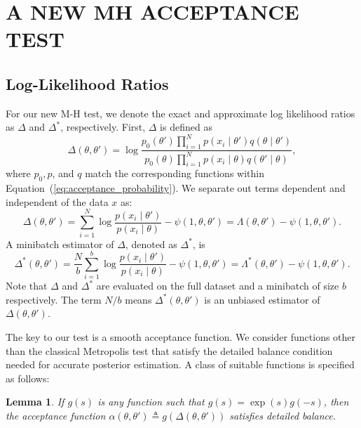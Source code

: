 \documentclass{article}
\newtheorem{lemma}{Lemma}
\begin{document}
\section{A NEW MH ACCEPTANCE TEST}\label{sec:our_algorithm}

\subsection{Log-Likelihood Ratios}\label{ssec:log_likelihood_ratios}

For our new M-H test, we denote the exact and approximate log likelihood ratios
as $\Delta$ and $\Delta^*$, respectively. First, $\Delta$ is defined as
\begin{equation}\label{eq:delta1}
    \Delta(\theta,\theta')  =
    \log \frac{p_0(\theta')\prod_{i=1}^N p(x_i \mid \theta')q(\theta \mid
    \theta')}{p_0(\theta)\prod_{i=1}^N p(x_i \mid \theta)q(\theta' \mid\theta)},
\end{equation}
where $p_0, p$, and $q$ match the corresponding functions within
Equation~(\ref{eq:acceptance_probability}). We separate out terms dependent and
independent of the data $x$ as:
\begin{equation}\label{eq:delta2}
\Delta(\theta,\theta') = \sum_{i=1}^N\log\frac{p(x_i\mid\theta')}{p(x_i\mid\theta)} - \psi(1,\theta,\theta') = \Lambda(\theta,\theta') - \psi(1,\theta,\theta').
\end{equation}
A minibatch estimator of $\Delta$, denoted as $\Delta^*$, is
\begin{equation}\label{eq:delta3}
\Delta^*(\theta,\theta') =
\frac{N}{b}\sum_{i=1}^b\log\frac{p(x_i\mid\theta')}{p(x_i\mid\theta)} -
\psi(1,\theta,\theta')=\Lambda^*(\theta,\theta') - \psi(1,\theta,\theta').
\end{equation}
Note that $\Delta$ and $\Delta^*$ are evaluated on the full dataset and a
minibatch of size $b$ respectively. The term $N/b$ means
$\Delta^*(\theta,\theta')$ is an unbiased estimator of $\Delta(\theta,\theta')$.

The key to our test is a smooth acceptance function.  We consider functions
other than the classical Metropolis test that satisfy the detailed balance
condition needed for accurate posterior estimation. A class of suitable
functions is specified as follows:

\begin{lemma}\label{lem:detailed_balance}
    If $g(s)$ is any function such that $g(s) = \exp(s) g(-s)$, then the
    acceptance function $\alpha(\theta,\theta') \triangleq
    g(\Delta(\theta,\theta'))$ satisfies detailed balance.
\end{lemma}
\end{document}
